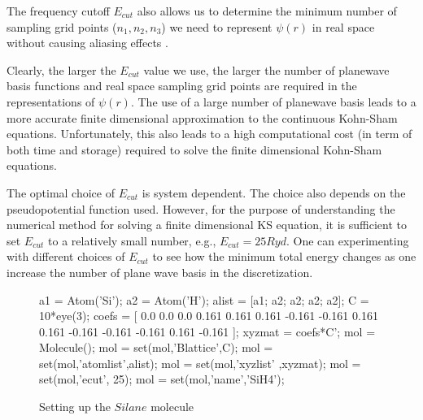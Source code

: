 \documentclass[11pt]{book}
\begin{document}
The frequency cutoff $E_{cut}$ also allows us to determine 
the minimum number of sampling grid points ($n_1, n_2, n_3$) we need
to represent $\psi(r)$ in real space without causing aliasing effects
\cite{kssolv}.

Clearly, the larger the $E_{cut}$ value we use, the larger the number of 
planewave basis functions and real space sampling grid points are required 
in the representations of $\psi(r)$. The use of a large number of planewave 
basis leads to a more accurate finite dimensional approximation to the
continuous Kohn-Sham equations.  Unfortunately, this also leads to a 
high computational cost (in term of both time and storage) required to solve 
the finite dimensional Kohn-Sham equations. 

The optimal choice of $E_{cut}$ is system dependent.  The choice also depends 
on the pseudopotential function used.  However, for the purpose of
understanding the numerical method for solving a finite dimensional KS 
equation, it is sufficient to set $E_{cut}$ to a relatively small number,
e.g., $E_{cut} = 25 Ryd$.  One can experimenting with different choices
of $E_{cut}$ to see how the minimum total energy changes as one increase
the number of plane wave basis in the discretization.
%
{\footnotesize
\begin{figure}[htbp]
\begin{center}
\begin{boxedverbatim}
%
%
a1 = Atom('Si');
a2 = Atom('H');
alist = [a1; a2; a2; a2; a2];
%
%
C = 10*eye(3);
%
%
coefs = [
 0.0     0.0      0.0
 0.161   0.161    0.161
-0.161  -0.161    0.161
 0.161  -0.161   -0.161
-0.161   0.161   -0.161
];
xyzmat = coefs*C';
%
%
mol = Molecule();
mol = set(mol,'Blattice',C);
mol = set(mol,'atomlist',alist);
mol = set(mol,'xyzlist' ,xyzmat);
mol = set(mol,'ecut', 25);  %
mol = set(mol,'name','SiH4');
\end{boxedverbatim}
\caption{Setting up the $Silane$ molecule}
\label{sih4source}
\end{center}
\end{figure}
}
%
\end{document}
